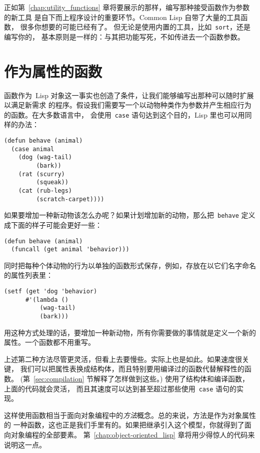 正如第~\ref{chap:utility_functions} 章将要展示的那样，编写那种接受函数作为参数的新工具
是自下而上程序设计的重要环节。Common Lisp 自带了大量的工具函数，
很多你想要的可能已经有了。
但无论是使用内置的工具，比如~\texttt{sort}，还是编写你的\utility，
基本原则是一样的：与其把功能写死，不如传进去一个函数参数。

\section{作为属性的函数}
\label{sec:functions_as_properties}

函数作为~Lisp 对象这一事实也创造了条件，让我们能够编写出那种可以随时扩展以满足新需求
的程序。假设我们需要写一个以动物种类作为参数并产生相应行为的函数。在大多数语言中，
会使用~\texttt{case} 
语句达到这个目的，Lisp 里也可以用同样的办法：
\begin{lstlisting}
(defun behave (animal)
  (case animal
    (dog (wag-tail)
         (bark))
    (rat (scurry)
         (squeak))
    (cat (rub-legs)
         (scratch-carpet))))
\end{lstlisting}

如果要增加一种新动物该怎么办呢？如果计划增加新的动物，那么把~\texttt{behave}
定义成下面的样子可能会更好一些：
\begin{lstlisting}
(defun behave (animal)
  (funcall (get animal 'behavior)))
\end{lstlisting}
同时把每种个体动物的行为以单独的函数形式保存，例如，存放在以它们名字命名的属性列表里：
\begin{lstlisting}
(setf (get 'dog 'behavior)
      #'(lambda ()
          (wag-tail)
          (bark)))
\end{lstlisting}
用这种方式处理的话，要增加一种新动物，所有你需要做的事情就是定义一个新的属性。一个函数都不用重写。

上述第二种方法尽管更灵活，但看上去要慢些。实际上也是如此。如果速度很关键，
我们可以把属性表换成结构体，而且特别要用编译过的函数代替解释性的函数。
(第~\ref{sec:compilation} 节解释了怎样做到这些。)
使用了结构体和编译函数，上面的代码就会灵活，
而且其速度可以达到甚至超过那些使用~\verb|case| 语句的实现。

这样使用函数相当于面向对象编程中的\emph{方法}概念。总的来说，方法是作为对象属性的
一种函数，这也正是我们手里有的。如果把继承引入这个模型，你就得到了面向对象编程的全部要素。
第~\ref{chap:object-oriented_lisp} 章将用少得惊人的代码来说明这一点。


